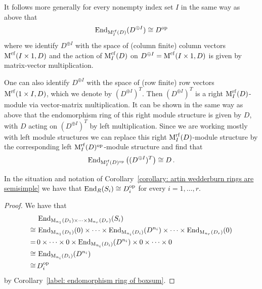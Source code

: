 \begin{remark}
  \label{remark: infinite matrix vector space correspondence for skew fields}
  It follows more generally for every nonempty index set $I$ in the same way as above that
  \[
          \operatorname{End}_{\operatorname{M}_I^{{\operatorname{cf}}}(D)}( D^{\oplus I} )
    \cong D^{\operatorname{op}}
  \]
  where we identify $D^{\oplus I}$ with the space of (column finite) column vectors $\operatorname{M}^{{\operatorname{cf}}}(I \times 1, D)$ and the action of $\operatorname{M}_I^{{\operatorname{cf}}}(D)$ on $D^{\oplus I} = \operatorname{M}^{{\operatorname{cf}}}(I \times 1, D)$ is given by matrix-vector multiplication.
  
  One can also identify $D^{\oplus I}$ with the space of (row finite) row vectors $\operatorname{M}^{{\operatorname{rf}}}(1 \times I, D)$, which we denote by $(D^{\oplus I})^T$.
  Then $(D^{\oplus I})^T$ is a right $\operatorname{M}_I^{{\operatorname{rf}}}(D)$-module via vector-matrix multiplication.
  It can be shown in the same way as above that the endomorphism ring of this right module structure is given by $D$, with $D$ acting on $(D^{\oplus I})^T$ by left multiplication.
  Since we are working mostly with left module structures we can replace this right $\operatorname{M}_I^{{\operatorname{rf}}}(D)$-module structure by the corresponding left $\operatorname{M}_I^{{\operatorname{rf}}}(D)^{\operatorname{op}}$-module structure and find that
  \[
          \operatorname{End}_{\operatorname{M}_I^{{\operatorname{rf}}}(D)^{\operatorname{op}}}\left( (D^{\oplus I})^T \right)
    \cong D \,.
  \]
\end{remark}


\begin{corollary}
  \label{corollary: endomorphism ring of Si}
  In the situation and notation of Corollary~\ref{corollary: artin wedderburn rings are semisimple} we have that $\operatorname{End}_R(S_i) \cong D_i^{\operatorname{op}}$ for every $i = 1, \dotsc, r$.
\end{corollary}


\begin{proof}
  We have that
  \begin{align*}
         &\,  \operatorname{End}_{\operatorname{M}_{n_1}(D_1) \times \dotsb \times \operatorname{M}_{n_r}(D_r)}(S_i)  \\
    \cong&\,  \operatorname{End}_{\operatorname{M}_{n_1}(D_1)}(0)
              \times \dotsb \times
              \operatorname{End}_{\operatorname{M}_{n_i}(D_i)}(D^{n_i}) 
              \times \dotsb \times
              \operatorname{End}_{\operatorname{M}_{n_r}(D_r)}(0) \\
        =&\,  0 \times \dotsb \times 0 \times \operatorname{End}_{\operatorname{M}_{n_i}(D_i)}(D^{n_i}) \times 0 \times \dotsb \times 0 \\
    \cong&\,  \operatorname{End}_{\operatorname{M}_{n_i}(D_i)}(D^{n_i}) \\
    \cong&\,  D_i^{\operatorname{op}}
  \end{align*}
  by Corollary~\ref{label: endomorphism ring of boxsum}.
\end{proof}



